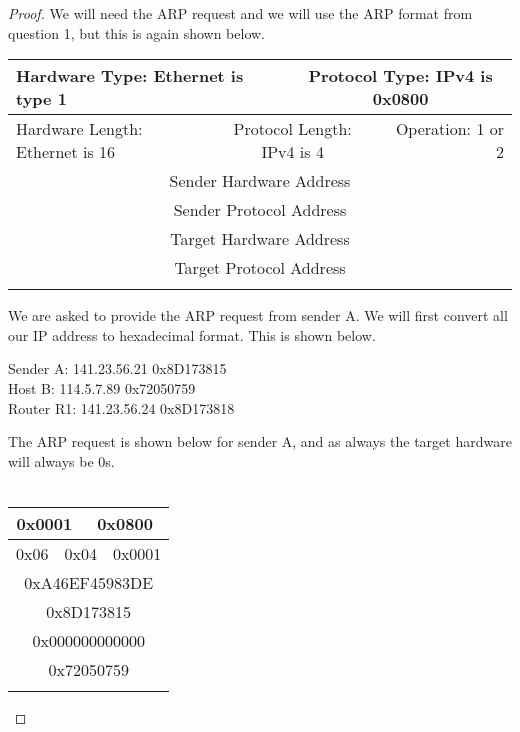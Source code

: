 \documentclass[12pt]{article}
\begin{document}
\begin{proof}
We will need the ARP request and we will use the ARP format from question 1, but this is again shown below. 

\begin{center}
\begin{tabular}{c c c c c c }
     \hline
    \multicolumn{3}{|l}{Hardware Type: Ethernet is type 1} & \multicolumn{3}{|c|}{Protocol Type: IPv4 is 0x0800} \\
    \hline
    \multicolumn{2}{|l}{Hardware Length: Ethernet is 16} & \multicolumn{2}{|c|}{Protocol Length: IPv4 is 4}  & \multicolumn{2}{r|}{Operation: 1 or 2} \\
     \hline
     \multicolumn{6}{|c|}{Sender Hardware Address} \\
     \hline 
     \multicolumn{6}{|c|}{Sender Protocol Address} \\ 
     \hline 
     \multicolumn{6}{|c|}{Target Hardware Address} \\
     \hline 
    \multicolumn{6}{|c|}{Target Protocol Address} \\
    \hline
    \\
\end{tabular}
\end{center}

We are asked to provide the ARP request from sender A. We will first convert all our IP address to hexadecimal format. This is shown below. 

\begin{center}
Sender A: 141.23.56.21 \longrightarrow 0x8D173815 \\
Host B: 114.5.7.89 \longrightarrow 0x72050759 \\
Router R1: 141.23.56.24 \longrightarrow 0x8D173818 \\ 
\end{center}

The ARP request is shown below for sender A, and as always the target hardware will always be 0s. \\ \\
\begin{center}
\begin{tabular}{c c c c c c }
     \hline
    \multicolumn{3}{|c}{0x0001} & \multicolumn{3}{|c|}{0x0800} \\
    \hline
    \multicolumn{2}{|c}{0x06} & \multicolumn{2}{|c|}{0x04}  & \multicolumn{2}{c|}{0x0001} \\
     \hline
     \multicolumn{6}{|c|}{0xA46EF45983DE} \\
     \hline 
     \multicolumn{6}{|c|}{0x8D173815} \\ 
     \hline 
     \multicolumn{6}{|c|}{0x000000000000} \\
     \hline 
    \multicolumn{6}{|c|}{0x72050759} \\
    \hline
    \\
\end{tabular}
\end{center}
\end{proof}
\end{document}
